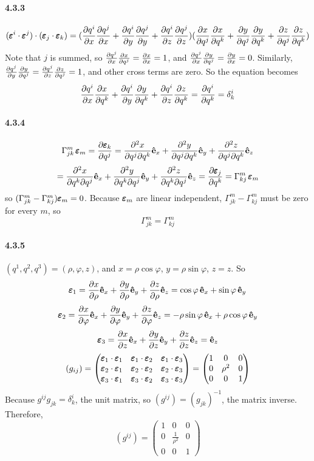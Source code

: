 \documentclass[a4paper]{article}
\begin{document}
\paragraph{4.3.3}
\[
(\EE^i\cdot\EE^j)\cdot(\EE_j\cdot\EE_k)=(\pdv{q^i}{x}\pdv{q^j}{x}+\pdv{q^i}{y}\pdv{q^j}{y}+\pdv{q^i}{z}\pdv{q^j}{z})(\pdv{x}{q^j}\pdv{x}{q^k}+\pdv{y}{q^j}\pdv{y}{q^k}+\pdv{z}{q^j}\pdv{z}{q^k})
\]
Note that $j$ is summed, so $\pdv{q^j}{x}\pdv{x}{q^j}=\pdv{x}{x}=1$, and $\pdv{q^j}{x}\pdv{y}{q^j}=\pdv{y}{x}=0$. Similarly, $\pdv{q^j}{y}\pdv{y}{q^j}=\pdv{q^j}{z}\pdv{z}{q^j}=1$, and  other cross terms are zero. So the equation becomes
\[
\pdv{q^i}{x}\pdv{x}{q^k}+\pdv{q^i}{y}\pdv{y}{q^k}+\pdv{q^i}{z}\pdv{z}{q^k}=\pdv{q^i}{q^k}=\delta^i_k
\]

\paragraph{4.3.4}
\[
\Gamma^m_{jk}\,\EE_m=\pdv{\EE_k}{q^j}=\pdv{^2x}{q^j\partial q^k}\VE_x+\pdv{^2y}{q^j\partial q^k}\VE_y+\pdv{^2z}{q^j\partial q^k}\VE_z
\]
\[
=\pdv{^2x}{q^k\partial q^j}\VE_x+\pdv{^2y}{q^k\partial q^j}\VE_y+\pdv{^2z}{q^k\partial q^j}\VE_z=
\pdv{\EE_j}{q^k}=\Gamma^m_{kj}\,\EE_m
\]
so $(\Gamma^m_{jk}-\Gamma^m_{kj})\EE_m=0$. Because $\EE_m$ are linear independent, $\Gamma^m_{jk}-\Gamma^m_{kj}$ must be zero for every $m$, so
\[
\Gamma^m_{jk}=\Gamma^m_{kj}
\]

\paragraph{4.3.5}
$(q^1,q^2,q^3)=(\rho,\varphi,z)$, and $x=\rho\cos\varphi$, $y=\rho\sin\varphi$, $z=z$. So
\[
\EE_1=\pdv{x}{\rho}\VE_x+\pdv{y}{\rho}\VE_y+\pdv{z}{\rho}\VE_z=\cos\varphi\,\VE_x+\sin\varphi\,\VE_y
\]
\[
\EE_2=\pdv{x}{\varphi}\VE_x+\pdv{y}{\varphi}\VE_y+\pdv{z}{\varphi}\VE_z=-\rho\sin\varphi\,\VE_x+\rho\cos\varphi\,\VE_y
\]
\[
\EE_3=\pdv{x}{z}\VE_x+\pdv{y}{z}\VE_y+\pdv{z}{z}\VE_z=\VE_z
\]
\[
(g_{ij})=
\begin{pmatrix}
\EE_1\cdot\EE_1&\EE_1\cdot\EE_2&\EE_1\cdot\EE_3\\
\EE_2\cdot\EE_1&\EE_2\cdot\EE_2&\EE_2\cdot\EE_3\\
\EE_3\cdot\EE_1&\EE_3\cdot\EE_2&\EE_3\cdot\EE_3\\
\end{pmatrix}=
\begin{pmatrix}
1&0&0\\
0&{\rho}^2&0\\
0&0&1
\end{pmatrix}
\]
Because $g^{ij}g_{jk}=\delta^i_k$, the unit matrix, so $(g^{ij})=(g_{jk})^{-1}$, the matrix inverse. Therefore,  
\[
(g^{ij})=
\begin{pmatrix}
1&0&0\\
0&\frac{1}{{\rho}^2}&0\\
0&0&1
\end{pmatrix}
\]
\end{document}
